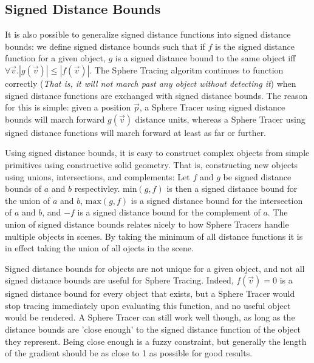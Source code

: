 		\subsection{Signed Distance Bounds}

			It is also possible to generalize signed distance functions into
			signed distance bounds: we define signed distance bounds such that
			if $f$ is the signed distance function for a given object, $g$ is a
			signed distance bound to the same object iff $\forall{} \vec{v}.
			|g(\vec{v})| \leq |f(\vec{v})|$. The Sphere Tracing algoritm
			continues to function correctly (\emph{That is, it will not march
			past any object without detecting it}) when signed distance
			functions are exchanged with signed distance bounds. The reason for
			this is simple: given a position $\vec{p}$, a Sphere Tracer using
			signed distance bounds will march forward $g(\vec{v})$ distance
			units, whereas a Sphere Tracer using signed distance functions will
			march forward at least as far or further.

			Using signed distance bounds, it is easy to construct complex
			objects from simple primitives using constructive solid geometry.
			That is, constructing new objects using unions, intersections, and
			complements: Let $f$ and $g$ be signed distance bounds of $a$ and
			$b$ respectivley. $\textrm{min}(g, f)$ is then a signed distance
			bound for the union of $a$ and $b$, $\textrm{max}(g, f)$ is a
			signed distance bound for the intersection of $a$ and $b$, and $-f$
			is a signed distance bound for the complement of $a$\cite{TODO}.
			The union of signed distance bounds relates nicely to how Sphere 
			Tracers handle multiple objects in scenes. By taking the minimum
			of all distance functions it is in effect taking the union of all
			ojects in the scene.

			Signed distance bounds for objects are not unique for a given
			object, and not all signed distance bounds are useful for Sphere
			Tracing. Indeed, $f(\vec{v}) = 0$ is a signed distance bound for
			every object that exists, but a Sphere Tracer would stop tracing
			immediately upon evaluating this function, and no useful object
			would be rendered. A Sphere Tracer can still work well though, as
			long as the distance bounds are 'close enough' to the signed
			distance function of the object they represent\cite{TODO}. Being
			close enough is a fuzzy constraint, but generally the length of the
			gradient should be as close to 1 as possible for good
			results\cite{TODO}.

